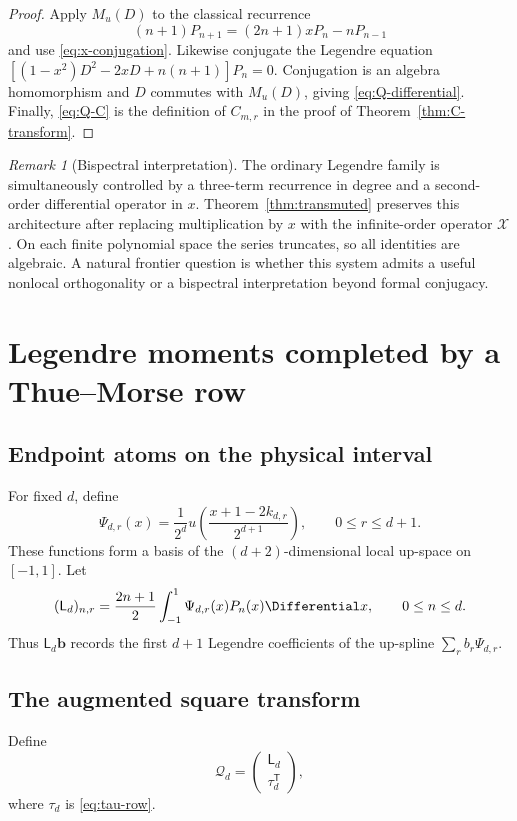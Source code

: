 \documentclass[11pt,oneside]{article}
\theoremstyle{definition}
\theoremstyle{remark}
\newtheorem{remark}[theorem]{Remark}
\newcommand{\cX}{\mathcal X}
\newcommand{\cQ}{\mathcal Q}
\begin{document}
\begin{proof}
Apply $M_u(D)$ to the classical recurrence
\[
 (n+1)P_{n+1}=(2n+1)xP_n-nP_{n-1}
\]
and use \eqref{eq:x-conjugation}.  Likewise conjugate the Legendre equation
$[(1-x^2)D^2-2xD+n(n+1)]P_n=0$.  Conjugation is an algebra homomorphism and
$D$ commutes with $M_u(D)$, giving \eqref{eq:Q-differential}.  Finally,
\eqref{eq:Q-C} is the definition of $C_{m,r}$ in the proof of
Theorem~\ref{thm:C-transform}.
\end{proof}

\begin{remark}[Bispectral interpretation]
The ordinary Legendre family is simultaneously controlled by a three-term
recurrence in degree and a second-order differential operator in $x$.
Theorem~\ref{thm:transmuted} preserves this architecture after replacing
multiplication by $x$ with the infinite-order operator $\cX$.  On each finite
polynomial space the series truncates, so all identities are algebraic.  A
natural frontier question is whether this system admits a useful nonlocal
orthogonality or a bispectral interpretation beyond formal conjugacy.
\end{remark}

\section{Legendre moments completed by a Thue--Morse row}
\label{sec:biorthogonal}

\subsection{Endpoint atoms on the physical interval}
For fixed $d$, define
\begin{equation}
 \Psi_{d,r}(x)=\frac1{2^d}
 u\!\left(\frac{x+1-2k_{d,r}}{2^{d+1}}\right),
 \qquad0\le r\le d+1.
 \label{eq:Psi}
\end{equation}
These functions form a basis of the $(d+2)$-dimensional local up-space on
$[-1,1]$.  Let
\begin{equation}
 (\mathsf L_d)_{n,r}=\frac{2n+1}{2}
 \int_{-1}^{1}\Psi_{d,r}(x)P_n(x)\Differential x,
 \qquad0\le n\le d.
 \label{eq:L-matrix}
\end{equation}
Thus $\mathsf L_d\bm b$ records the first $d+1$ Legendre coefficients of the
up-spline $\sum_rb_r\Psi_{d,r}$.

\subsection{The augmented square transform}
Define
\begin{equation}
 \cQ_d=
 \begin{pmatrix}
 \mathsf L_d\\[0.2em]
 \tau_d^{\mathsf T}
 \end{pmatrix},
 \label{eq:Q-augmented}
\end{equation}
where $\tau_d$ is \eqref{eq:tau-row}.
\end{document}
